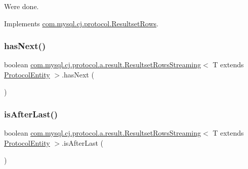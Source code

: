 We\textquotesingle{}re done. 

Implements \mbox{\hyperlink{interfacecom_1_1mysql_1_1cj_1_1protocol_1_1_resultset_rows_aae10da1813382e04a356d4e282d1a7f9}{com.\+mysql.\+cj.\+protocol.\+Resultset\+Rows}}.

\mbox{\label{classcom_1_1mysql_1_1cj_1_1protocol_1_1a_1_1result_1_1_resultset_rows_streaming_aaa49f432c3992ae2bbe56bbc4c273fb8}} 
\subsubsection{\texorpdfstring{has\+Next()}{hasNext()}}
{\footnotesize\ttfamily boolean \mbox{\hyperlink{classcom_1_1mysql_1_1cj_1_1protocol_1_1a_1_1result_1_1_resultset_rows_streaming}{com.\+mysql.\+cj.\+protocol.\+a.\+result.\+Resultset\+Rows\+Streaming}}$<$ T extends \mbox{\hyperlink{interfacecom_1_1mysql_1_1cj_1_1protocol_1_1_protocol_entity}{Protocol\+Entity}} $>$.has\+Next (\begin{DoxyParamCaption}{ }\end{DoxyParamCaption})}

\mbox{\label{classcom_1_1mysql_1_1cj_1_1protocol_1_1a_1_1result_1_1_resultset_rows_streaming_a87d9941d48a1d379d2387082904ebe6c}} 
\subsubsection{\texorpdfstring{is\+After\+Last()}{isAfterLast()}}
{\footnotesize\ttfamily boolean \mbox{\hyperlink{classcom_1_1mysql_1_1cj_1_1protocol_1_1a_1_1result_1_1_resultset_rows_streaming}{com.\+mysql.\+cj.\+protocol.\+a.\+result.\+Resultset\+Rows\+Streaming}}$<$ T extends \mbox{\hyperlink{interfacecom_1_1mysql_1_1cj_1_1protocol_1_1_protocol_entity}{Protocol\+Entity}} $>$.is\+After\+Last (\begin{DoxyParamCaption}{ }\end{DoxyParamCaption})}

